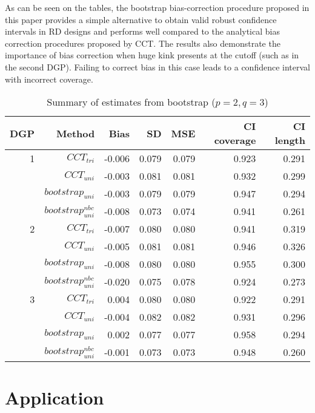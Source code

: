 \documentclass[12pt,fleqn]{article}
\begin{document}
As can be seen on the tables, the bootstrap bias-correction procedure proposed in this paper provides a simple alternative to obtain 
valid robust confidence intervals in RD designs and performs well compared to the analytical 
bias correction procedures proposed by CCT. The results also demonstrate the importance of bias correction when huge kink 
presents at the cutoff (such as in the second DGP). Failing to correct bias in this case leads to a confidence interval with incorrect coverage.

\begin{table}[t]
\centering
\begin{tabular}{rrrrrrr}
  \toprule
  DGP & Method    & Bias    & SD    & MSE   & CI coverage & CI length \\
  \midrule
    1 & $CCT_{tri}$ & -0.006 & 0.079 & 0.079 & 0.923 & 0.291 \\ 
      & $CCT_{uni}$ & -0.003 & 0.081 & 0.081 & 0.932 & 0.299 \\ 
      & $bootstrap_{uni}$       & -0.003 & 0.079 & 0.079 & 0.947 & 0.294 \\ 
      & $bootstrap_{uni}^{nbc}$ & -0.008 & 0.073 & 0.074 & 0.941 & 0.261 \\ 
     \midrule
    2 & $CCT_{tri}$ & -0.007 & 0.080 & 0.080 & 0.941 & 0.319 \\ 
      & $CCT_{uni}$ & -0.005 & 0.081 & 0.081 & 0.946 & 0.326 \\ 
      & $bootstrap_{uni}$       & -0.008 & 0.080 & 0.080 & 0.955 & 0.300 \\ 
      & $bootstrap_{uni}^{nbc}$ & -0.020 & 0.075 & 0.078 & 0.924 & 0.273 \\ 
     \midrule
    3 & $CCT_{tri}$ & 0.004 & 0.080 & 0.080 & 0.922 & 0.291 \\ 
      & $CCT_{uni}$ & -0.004 & 0.082 & 0.082 & 0.931 & 0.296 \\ 
      & $bootstrap_{uni}$       & 0.002 & 0.077 & 0.077 & 0.958 & 0.294 \\ 
      & $bootstrap_{uni}^{nbc}$ & -0.001 & 0.073 & 0.073 & 0.948 & 0.260 \\ 
  \bottomrule
\end{tabular}
\caption{Summary of estimates from bootstrap ($p = 2, q = 3$)}
\label{Tb: simulation 2}
\end{table}

\section{Application}\label{application}
\end{document}
